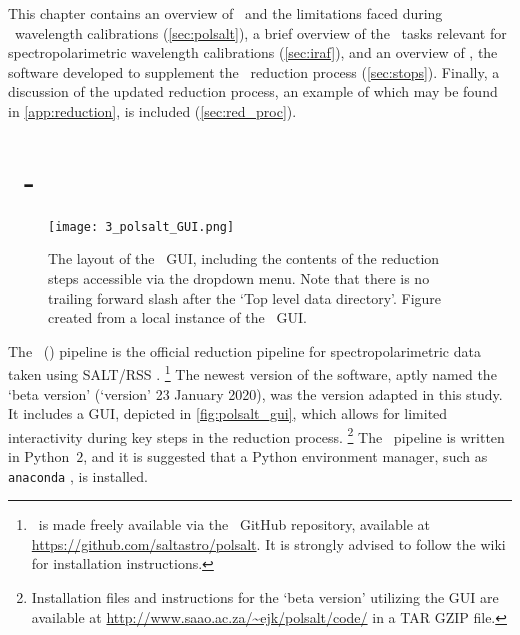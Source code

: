 \label{ch:03} %

This chapter contains an overview of \polsalt\ and the limitations faced during \polsalt\ wavelength calibrations (\autoref{sec:polsalt}), a brief overview of the \iraf\ tasks relevant for spectropolarimetric wavelength calibrations (\autoref{sec:iraf}), and an overview of \stops, the software developed to supplement the \polsalt\ reduction process (\autoref{sec:stops}). Finally, a discussion of the updated reduction process, an example of which may be found in \autoref{app:reduction}, is included (\autoref{sec:red_proc}).

\section[\textsc{polsalt}]{\polsalt\ - } \label{sec:polsalt}

\begin{figure}[t]
    \centering
    \texttt{[image: 3\_polsalt\_GUI.png]}
    \caption{The layout of the \polsalt\ \gls{GUI}, including the contents of the reduction steps accessible via the dropdown menu. Note that there is no trailing forward slash after the `Top level data directory'. Figure created from a local instance of the \polsalt\ \gls{GUI}.}
    \label{fig:polsalt_gui}
\end{figure}

The \polsalt\ () pipeline is the official reduction pipeline for spectropolarimetric data taken using \gls{SALT}/\gls{RSS} \citep{polsalt}.%
\footnote{\polsalt\ is made freely available via the \polsalt\ GitHub repository, available at \url{https://github.com/saltastro/polsalt}. It is strongly advised to follow the wiki for installation instructions.}
The newest version of the software, aptly named the `beta version' (`version' 23 January 2020), was the version adapted in this study. It includes a \gls{GUI}, depicted in \autoref{fig:polsalt_gui}, which allows for limited interactivity during key steps in the reduction process.%
\footnote{Installation files and instructions for the `beta version' utilizing the \gls{GUI} are available at \url{http://www.saao.ac.za/~ejk/polsalt/code/} in a TAR GZIP file.}
The \polsalt\ pipeline is written in Python~$2$, and it is suggested that a Python environment manager, such as \texttt{anaconda} \citep{anaconda}, is installed.

